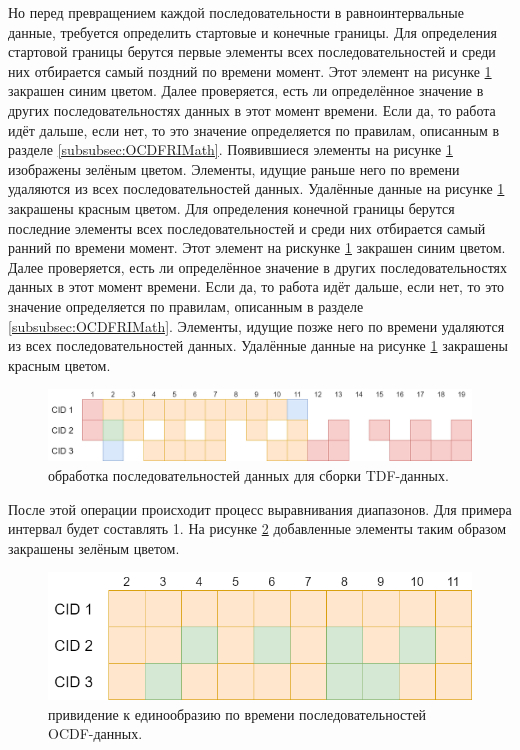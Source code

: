 {  \par Но перед превращением каждой последовательности в равноинтервальные данные, требуется определить стартовые и конечные границы. Для определения стартовой границы берутся первые элементы всех последовательностей и среди них отбирается самый поздний по времени момент. Этот элемент на рисунке \ref{fig:CreateTDFstage2} закрашен синим цветом. Далее проверяется, есть ли определённое значение в других последовательностях данных в этот момент времени. Если да, то работа идёт дальше, если нет, то это значение определяется по правилам, описанным в разделе \ref{subsubsec:OCDFRIMath}. Появившиеся элементы на рисунке \ref{fig:CreateTDFstage2} изображены зелёным цветом. Элементы, идущие раньше него по времени удаляются из всех последовательностей данных. Удалённые данные на рисунке \ref{fig:CreateTDFstage2} закрашены красным цветом. Для определения конечной границы берутся последние элементы всех последовательностей и среди них отбирается самый ранний по времени момент. Этот элемент на рискунке \ref{fig:CreateTDFstage2} закрашен синим цветом. Далее проверяется, есть ли определённое значение в других последовательностях данных в этот момент времени. Если да, то работа идёт дальше, если нет, то это значение определяется по правилам, описанным в разделе \ref{subsubsec:OCDFRIMath}. Элементы, идущие позже него по времени удаляются из всех последовательностей данных. Удалённые данные на рисунке \ref{fig:CreateTDFstage2} закрашены красным цветом.

  \begin{figure}[H]
    \centering
    \includegraphics[width=\textwidth]{images/forDataManipulator/CreateTDFstage2.drawio.png}
    \caption{обработка последовательностей данных для сборки TDF-данных.}
    \label{fig:CreateTDFstage2}
  \end{figure}

  \par После этой операции происходит процесс выравнивания диапазонов. Для примера интервал будет составлять 1. На рисунке \ref{fig:CreateTDFstage3} добавленные элементы таким образом закрашены зелёным цветом.

  \begin{figure}[H]
    \centering
    \includegraphics[width=\textwidth]{images/forDataManipulator/CreateTDFstage3.drawio.png}
    \caption{привидение к единообразию по времени последовательностей OCDF-данных.}
    \label{fig:CreateTDFstage3}
  \end{figure}

}
